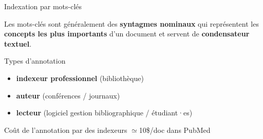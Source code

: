 \begin{frame}{Indexation par mots-clés}

    Les mots-clés sont généralement des \textbf{syntagmes nominaux} qui représentent les \textbf{concepts les plus importants} d’un document et servent de \textbf{condensateur textuel}.~\cite{amar_les_1997}


    \begin{block}{Types d'annotation}
        \begin{itemize}
        \item \textbf{indexeur professionnel} (bibliothèque) 
        \item \textbf{auteur} (conférences / journaux)
        \item \textbf{lecteur} (logiciel gestion bibliographique / étudiant·es)
        \end{itemize}
    \end{block}

    \begin{alertblock}{Coût de l'annotation par des indexeurs}
        $\simeq$10\$/doc dans PubMed \\
         
    \end{alertblock}

\end{frame}


